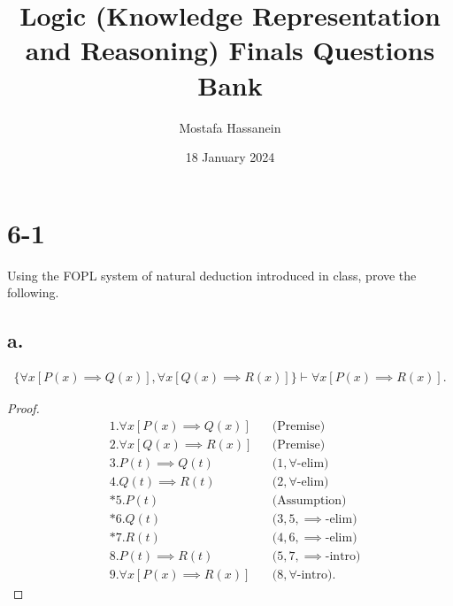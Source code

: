 \documentclass{article}
\author{Mostafa Hassanein}
\title{Logic (Knowledge Representation and Reasoning) Finals Questions Bank}
\date{18 January 2024}
\begin{document}
\maketitle
\newpage

\section*{6-1}

Using the FOPL system of natural deduction introduced in class, prove the following.

\subsection*{a.}
\begin{align*}
  \{ 
  \forall x \left[ P(x) \implies Q(x) \right],
  \forall x \left[ Q(x) \implies R(x) \right] \}
  \vdash
  \forall x \left[ P(x) \implies R(x) \right].
\end{align*}
\begin{proof}
  \begin{align*}
    &1. \forall x \left[ P(x) \implies Q(x) \right] &&\text{(Premise)} \\
    &2. \forall x \left[ Q(x) \implies R(x) \right] &&\text{(Premise)} \\
    &3. P(t) \implies Q(t) &&\text{($1, \forall$-elim)} \\
    &4. Q(t) \implies R(t) &&\text{($2, \forall$-elim)} \\
    &*5. P(t) &&\text{(Assumption)} \\
    &*6. Q(t) &&\text{($3 , 5, \implies$-elim)} \\
    &*7. R(t) &&\text{($4 , 6, \implies$-elim)} \\
    &8. P(t) \implies R(t) &&\text{($5, 7, \implies$-intro)} \\
    &9. \forall x \left[ P(x) \implies R(x) \right] &&\text{($8, \forall$-intro)}.
  \end{align*}
\end{proof}

\newpage
\end{document}
